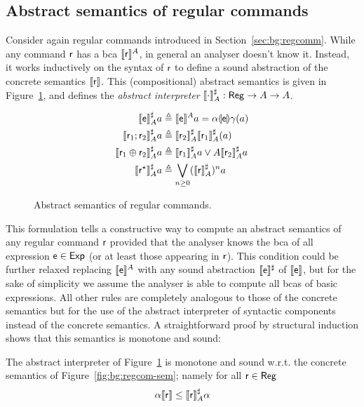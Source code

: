 \subsection{Abstract semantics of regular commands}
Consider again regular commands introduced in Section~\ref{sec:bg:regcomm}. While any command $\mathsf{r}$ has a bca $\llbracket\mathsf{r}\rrbracket^{A}$, in general an analyser doesn't know it. Instead, it works inductively on the syntax of $\mathsf{r}$ to define a sound abstraction of the concrete semantics $\llbracket\mathsf{r}\rrbracket$. This (compositional) abstract semantics is given in Figure~\ref{fig:bg:regcom-abs-sem}, and defines the \emph{abstract interpreter} $\llbracket\cdot\rrbracket^{\sharp}_{A} : \mathsf{Reg} \rightarrow A \rightarrow A$.
\begin{figure}[t]
	\begin{align*}
		\llbracket\mathsf{e}\rrbracket^{\sharp}_{A} a                    & \triangleq \llbracket\mathsf{e}\rrbracket^{A} a = \alpha \llparenthesis\mathsf{e}\rrparenthesis \gamma (a)               \\
		\llbracket\mathsf{r}_1 ; \mathsf{r}_2\rrbracket^{\sharp}_{A} a        & \triangleq \llbracket\mathsf{r}_2\rrbracket^{\sharp}_{A} \llbracket\mathsf{r}_1\rrbracket^{\sharp}_{A} (a)        \\
		\llbracket\mathsf{r}_1 \oplus \mathsf{r}_2\rrbracket^{\sharp}_{A} a & \triangleq \llbracket\mathsf{r}_1\rrbracket^{\sharp}_{A} a \vee A \llbracket\mathsf{r}_2\rrbracket^{\sharp}_{A} a \\
		\llbracket\mathsf{r}^\star\rrbracket^{\sharp}_{A} a             & \triangleq \bigvee_{n \ge 0}  (\llbracket\mathsf{r}\rrbracket^{\sharp}_{A})^n a
	\end{align*}
	\caption{Abstract semantics of regular commands.}
	\label{fig:bg:regcom-abs-sem}
\end{figure}
This formulation tells a constructive way to compute an abstract semantics of any regular command $\mathsf{r}$ provided that the analyser knows the bca of all expression $\mathsf{e} \in \mathsf{Exp}$ (or at least those appearing in $\mathsf{r}$). This condition could be further relaxed replacing $\llbracket\mathsf{e}\rrbracket^{A}$ with any sound abstraction $\llbracket\mathsf{e}\rrbracket^{\sharp}$ of $\llbracket\mathsf{e}\rrbracket$, but for the sake of simplicity we assume the analyser is able to compute all bcas of basic expressions. All other rules are completely analogous to those of the concrete semantics but for the use of the abstract interpreter of syntactic components instead of the concrete semantics.
A straightforward proof by structural induction shows that this semantics is monotone and sound:
\begin{prop}\label{prop:bg:regcom-abs-sem-sound}
	The abstract interpreter of Figure~\ref{fig:bg:regcom-abs-sem} is monotone and sound w.r.t. the concrete semantics of Figure~\ref{fig:bg:regcom-sem}; namely for all $\mathsf{r} \in \mathsf{Reg}$
	\[
	\alpha \llbracket\mathsf{r}\rrbracket \le \llbracket\mathsf{r}\rrbracket^{\sharp}_A \alpha
	\]
\end{prop}
